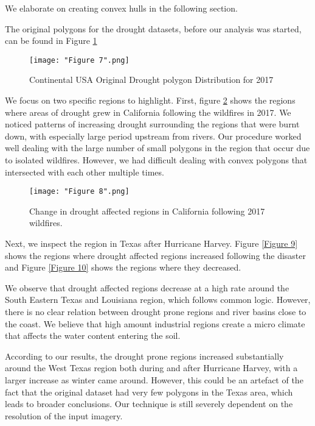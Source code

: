 \documentclass[conference]{IEEEtran}
\begin{document}
We elaborate on creating convex hulls in the following section.

The original polygons for the drought datasets, before our analysis was started, can be found in Figure \ref{Figure 7}

\begin{figure}[ht]
\centerline{\texttt{[image: "Figure 7".png]}}
\caption{Continental USA  Original Drought polygon Distribution for 2017}
\label{Figure 7}
\end{figure}

We focus on two specific regions to highlight. First, figure \ref{Figure 8} shows the regions where areas of drought grew in California following the wildfires in 2017. We noticed patterns of increasing drought surrounding the regions that were burnt down, with especially large period upstream from rivers. Our procedure worked well dealing with the large number of small polygons in the region that occur due to isolated wildfires. However, we had difficult dealing with convex polygons that intersected with each other multiple times.

\begin{figure}[ht]
\centerline{\texttt{[image: "Figure 8".png]}}
\caption{Change in drought affected regions in California following 2017 wildfires.}
\label{Figure 8}
\end{figure}

Next, we inspect the region in Texas after Hurricane Harvey. Figure \ref{Figure 9} shows the regions where drought affected regions increased following the disaster and Figure \ref{Figure 10} shows the regions where they decreased.

We observe that drought affected regions decrease at a high rate around the South Eastern Texas and Louisiana region, which follows common logic. However, there is no clear relation between drought prone regions and river basins close to the coast. We believe that high amount industrial regions create a micro climate that affects the water content entering the soil.

According to our results, the drought prone regions increased substantially around the West Texas region both during and after Hurricane Harvey, with a larger increase as winter came around. However, this could be an artefact of the fact that the original dataset had very few polygons in the Texas area, which leads to broader conclusions. Our technique is still severely dependent on the resolution of the input imagery.
\end{document}
